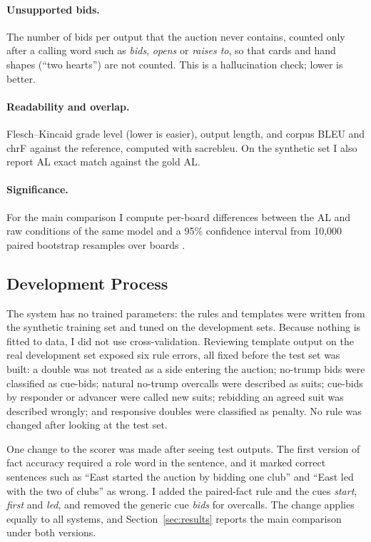 \documentclass[11pt]{article}
\begin{document}
\paragraph{Unsupported bids.} The number of bids per output that the auction never contains, counted only after a calling word such as \emph{bids}, \emph{opens} or \emph{raises to}, so that cards and hand shapes (``two hearts'') are not counted. This is a hallucination check; lower is better.

\paragraph{Readability and overlap.} Flesch--Kincaid grade level \citep{kincaid1975derivation} (lower is easier), output length, and corpus BLEU and chrF against the reference, computed with sacrebleu. On the synthetic set I also report AL exact match against the gold AL.

\paragraph{Significance.} For the main comparison I compute per-board differences between the AL and raw conditions of the same model and a 95\% confidence interval from 10,000 paired bootstrap resamples over boards \citep{koehn2004statistical}.

\subsection{Development Process}
\label{sec:dev}

The system has no trained parameters: the rules and templates were written from the synthetic training set and tuned on the development sets. Because nothing is fitted to data, I did not use cross-validation. Reviewing template output on the real development set exposed six rule errors, all fixed before the test set was built: a double was not treated as a side entering the auction; no-trump bids were classified as cue-bids; natural no-trump overcalls were described as suits; cue-bids by responder or advancer were called new suits; rebidding an agreed suit was described wrongly; and responsive doubles were classified as penalty. No rule was changed after looking at the test set.

One change to the scorer was made after seeing test outputs. The first version of fact accuracy required a role word in the sentence, and it marked correct sentences such as ``East started the auction by bidding one club'' and ``East led with the two of clubs'' as wrong. I added the paired-fact rule and the cues \emph{start}, \emph{first} and \emph{led}, and removed the generic cue \emph{bids} for overcalls. The change applies equally to all systems, and Section~\ref{sec:results} reports the main comparison under both versions.
\end{document}
